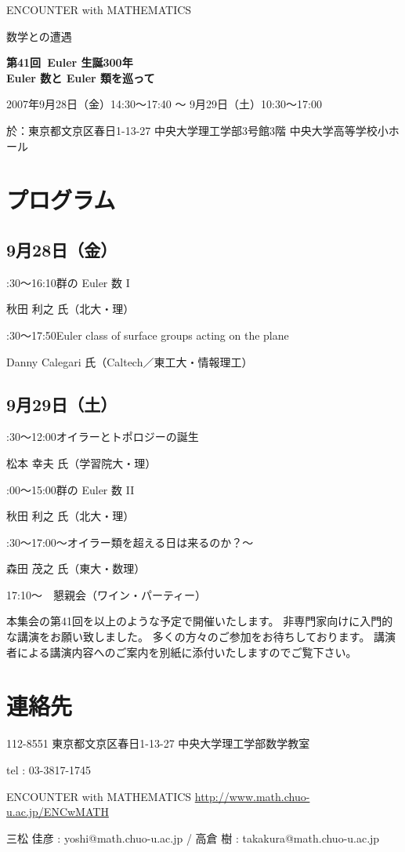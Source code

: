 \documentclass[uplatex,dvipdfmx]{jlreq}
\newcommand{\talk}[3]{%
\noindent
#1\quad #2\par
\hspace*{2em}#3\par\smallskip
}
\newcommand{\EwMnumber}{第41回}
\newcommand{\EwMtitle}{Euler 生誕300年\\[2mm]\large Euler 数と Euler 類を巡って}
\newcommand{\EwMdate}{2007年9月28日（金）14:30～17:40 ～ 9月29日（土）10:30～17:00}
\newcommand{\EwMplace}{東京都文京区春日1-13-27 中央大学理工学部3号館3階 中央大学高等学校小ホール}
\newcommand{\EwMtitleblock}{
\vspace*{-5mm}
\begin{center}
{\Large ENCOUNTER with MATHEMATICS}

\vspace{2mm}
{\large 数学との遭遇}

\vspace{4mm}
{\Large \bfseries \EwMnumber\ \EwMtitle}

\vspace{4mm}
\EwMdate

\vspace{2mm}
於：\EwMplace
\end{center}

\vspace{2mm}
}
\begin{document}
\EwMtitleblock

\section*{プログラム}

\subsection*{9月28日（金）}

\talk
{14:30～16:10}
{群の Euler 数 I}
{秋田 利之 氏（北大・理）}

\talk
{16:30～17:50}
{Euler class of surface groups acting on the plane}
{Danny Calegari 氏（Caltech／東工大・情報理工）}

\subsection*{9月29日（土）}

\talk
{10:30～12:00}
{オイラーとトポロジーの誕生}
{松本 幸夫 氏（学習院大・理）}

\talk
{14:00～15:00}
{群の Euler 数 II}
{秋田 利之 氏（北大・理）}

\talk
{15:30～17:00}
{～オイラー類を超える日は来るのか？～}
{森田 茂之 氏（東大・数理）}

\bigskip

17:10～　懇親会（ワイン・パーティー）

\bigskip

本集会の第41回を以上のような予定で開催いたします。  
非専門家向けに入門的な講演をお願い致しました。  
多くの方々のご参加をお待ちしております。  
講演者による講演内容へのご案内を別紙に添付いたしますのでご覧下さい。

\section*{連絡先}

112-8551 東京都文京区春日1-13-27 中央大学理工学部数学教室  

tel : 03-3817-1745  

ENCOUNTER with MATHEMATICS  
\url{http://www.math.chuo-u.ac.jp/ENCwMATH}  

三松 佳彦 : yoshi@math.chuo-u.ac.jp / 高倉 樹 : takakura@math.chuo-u.ac.jp
\end{document}
